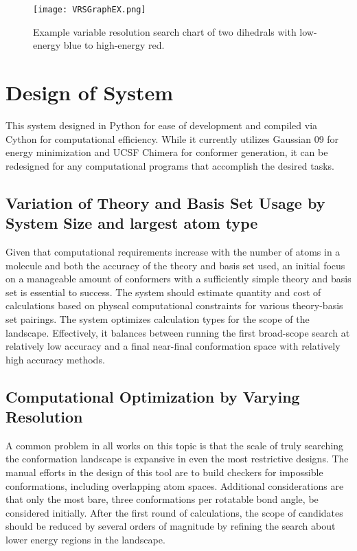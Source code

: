 \begin{figure}
	
	\centering
	
	\texttt{[image: VRSGraphEX.png]}
	
	\caption{Example variable resolution search chart of two dihedrals with low-energy blue to high-energy red.}
	
	\label{fig:variableResolutionSample}
		
\end{figure}

\section{Design of System}

This system designed in Python for ease of development and compiled via Cython for computational efficiency. 
While it currently utilizes Gaussian 09 for energy minimization and UCSF Chimera for conformer generation, it can be redesigned for any computational programs that accomplish the desired tasks.

\subsection{Variation of Theory and Basis Set Usage by System Size and largest atom type}

Given that computational requirements increase with the number of atoms in a molecule and both the accuracy of the theory and basis set used, an initial focus on a manageable amount of conformers with a sufficiently simple theory and basis set is essential to success.
The system should estimate quantity and cost of calculations based on physcal computational constraints for various theory-basis set pairings. 
The system optimizes calculation types for the scope of the landscape.
Effectively, it balances between running the first broad-scope search at relatively low accuracy and a final near-final conformation space with relatively high accuracy methods.


\subsection{Computational Optimization by Varying Resolution}

A common problem in all works on this topic is that the scale of truly searching the conformation landscape is expansive in even the most restrictive designs. 
The manual efforts in the design of this tool are to build checkers for impossible conformations, including overlapping atom spaces.
Additional considerations are that only the most bare, three conformations per rotatable bond angle, be considered initially.
After the first round of calculations, the scope of candidates should be reduced by several orders of magnitude by refining the search about lower energy regions in the landscape.


